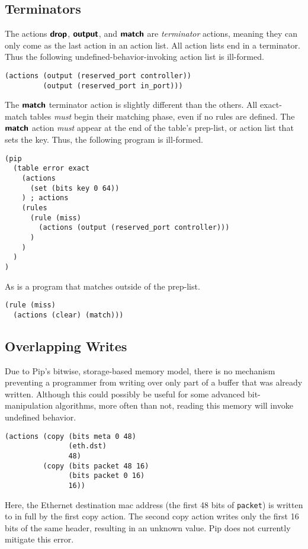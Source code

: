 \subsection{Terminators}
The actions $\bm{\mathsf{{drop}}}$, $\bm{\mathsf{{output}}}$, and $\bm{\mathsf{{match}}}$ are \textit{terminator} actions, meaning they can only come as the last action in an action list. All action lists end in a terminator. Thus the following undefined-behavior-invoking action list is ill-formed.
\begin{mdframed}
\begin{verbatim}
(actions (output (reserved_port controller)) 
         (output (reserved_port in_port)))
\end{verbatim}
\end{mdframed}
The $\bm{\mathsf{{match}}}$ terminator action is slightly different than the others. All exact-match tables \textit{must} begin their matching phase, even if no rules are defined. The $\bm{\mathsf{{match}}}$ action \textit{must} appear at the end of the table's prep-list, or action list that sets the key. Thus, the following program is ill-formed.
\begin{mdframed}
\begin{verbatim}
(pip
  (table error exact
    (actions
      (set (bits key 0 64))
    ) ; actions
    (rules
      (rule (miss)
        (actions (output (reserved_port controller)))
      )
    )
  )
)
\end{verbatim}
\end{mdframed}
As is a program that matches outside of the prep-list.
\begin{mdframed}
\begin{verbatim}
(rule (miss)
  (actions (clear) (match)))
\end{verbatim}
\end{mdframed}

\subsection{Overlapping Writes}
Due to Pip's bitwise, storage-based memory model, there is no mechanism preventing a programmer from writing over only part of a buffer that was already written. Although this could possibly be useful for some advanced bit-manipulation algorithms, more often than not, reading this memory will invoke undefined behavior.
\begin{mdframed}
\begin{verbatim}
(actions (copy (bits meta 0 48)
               (eth.dst)
               48)
         (copy (bits packet 48 16)
               (bits packet 0 16)
               16))
\end{verbatim}
\end{mdframed}
Here, the Ethernet destination mac address (the first 48 bits of \texttt{packet}) is written to in full by the first copy action. The second copy action writes only the first 16 bits of the same header, resulting in an unknown value. Pip does not currently mitigate this error.
